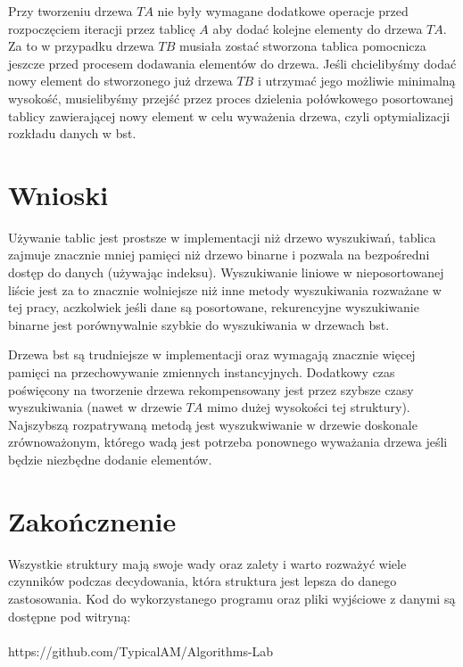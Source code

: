 \documentclass{article}
\begin{document}
Przy tworzeniu drzewa $TA$ nie były wymagane dodatkowe operacje przed rozpoczęciem iteracji przez tablicę $A$ aby dodać kolejne elementy do drzewa $TA$. Za to w przypadku drzewa $TB$ musiała zostać stworzona tablica pomocnicza jeszcze przed procesem dodawania elementów do drzewa. Jeśli chcielibyśmy dodać nowy element do stworzonego już drzewa $TB$ i utrzymać jego możliwie minimalną wysokość, musielibyśmy przejść przez proces dzielenia połówkowego posortowanej tablicy zawierającej nowy element w celu wyważenia drzewa, czyli optymializacji rozkładu danych w bst.

\section{Wnioski}

Używanie tablic jest prostsze w implementacji niż drzewo wyszukiwań, tablica zajmuje znacznie mniej pamięci niż drzewo binarne i pozwala na bezpośredni dostęp do danych (używając indeksu). Wyszukiwanie liniowe w nieposortowanej liście jest za to znacznie wolniejsze niż inne metody wyszukiwania rozważane w tej pracy, aczkolwiek jeśli dane są posortowane, rekurencyjne wyszukiwanie binarne jest porównywalnie szybkie do wyszukiwania w drzewach bst.

Drzewa bst są trudniejsze w implementacji oraz wymagają znacznie więcej pamięci na przechowywanie zmiennych instancyjnych. Dodatkowy czas poświęcony na tworzenie drzewa rekompensowany jest przez szybsze czasy wyszukiwania (nawet w drzewie $TA$ mimo dużej wysokości tej struktury). Najszybszą rozpatrywaną metodą jest wyszukwiwanie w drzewie doskonale zrównoważonym, którego wadą jest potrzeba ponownego wyważania drzewa jeśli będzie niezbędne dodanie elementów.

\section{Zakończnenie}

Wszystkie struktury mają swoje wady oraz zalety i warto rozważyć wiele czynników podczas decydowania, która struktura jest lepsza do danego zastosowania. Kod do wykorzystanego programu oraz pliki wyjściowe z danymi są dostępne pod witryną: \\\\
https://github.com/TypicalAM/Algorithms-Lab
\end{document}
